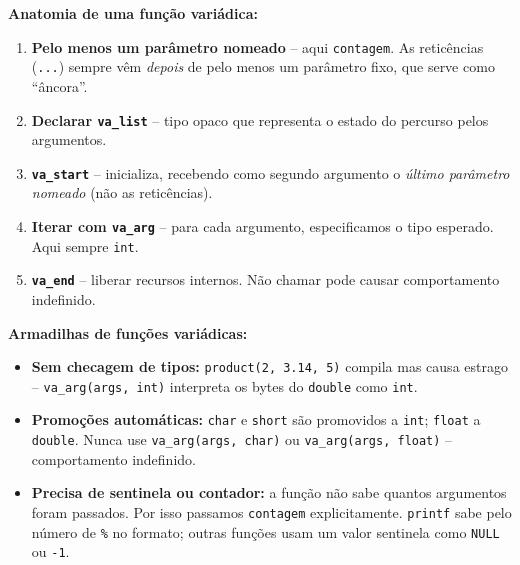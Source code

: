 \documentclass[12pt,a4paper]{article}
\begin{document}
\begin{boaprática}
\textbf{Anatomia de uma função variádica:}

\begin{enumerate}[noitemsep]
  \item \textbf{Pelo menos um parâmetro nomeado} -- aqui \texttt{contagem}. As
  reticências (\texttt{...}) sempre vêm \textit{depois} de pelo menos um parâmetro
  fixo, que serve como ``âncora''.

  \item \textbf{Declarar \texttt{va\_list}} -- tipo opaco que representa o estado
  do percurso pelos argumentos.

  \item \textbf{\texttt{va\_start}} -- inicializa, recebendo como segundo
  argumento o \textit{último parâmetro nomeado} (não as reticências).

  \item \textbf{Iterar com \texttt{va\_arg}} -- para cada argumento, especificamos
  o tipo esperado. Aqui sempre \texttt{int}.

  \item \textbf{\texttt{va\_end}} -- liberar recursos internos. Não chamar pode
  causar comportamento indefinido.
\end{enumerate}
\end{boaprática}

\bigskip

\begin{erroco}
\textbf{Armadilhas de funções variádicas:}

\begin{itemize}[noitemsep]
  \item \textbf{Sem checagem de tipos:} \texttt{product(2, 3.14, 5)} compila mas
  causa estrago -- \texttt{va\_arg(args, int)} interpreta os bytes do \texttt{double}
  como \texttt{int}.

  \item \textbf{Promoções automáticas:} \texttt{char} e \texttt{short} são promovidos
  a \texttt{int}; \texttt{float} a \texttt{double}. Nunca use \texttt{va\_arg(args, char)}
  ou \texttt{va\_arg(args, float)} -- comportamento indefinido.

  \item \textbf{Precisa de sentinela ou contador:} a função não sabe quantos
  argumentos foram passados. Por isso passamos \texttt{contagem} explicitamente.
  \texttt{printf} sabe pelo número de \texttt{\%} no formato; outras funções
  usam um valor sentinela como \texttt{NULL} ou \texttt{-1}.
\end{itemize}
\end{erroco}
\end{document}
